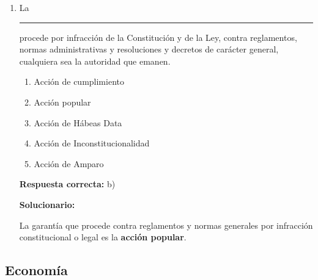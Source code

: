 \begin{enumerate}[resume]
	\vspace{2mm}
	\textbf{Solucionario:}
	
	Uno de los fines esenciales de la ONU es \textbf{mantener la paz mundial}.
	
	\vspace{6mm}
	
	\item La \rule{3cm}{0.4pt} procede por infracción de la Constitución y de la Ley, contra reglamentos, normas administrativas y resoluciones y decretos de carácter general, cualquiera sea la autoridad que emanen.
	\begin{enumerate}[label=\alph*)]
		\item Acción de cumplimiento
		\item Acción popular
		\item Acción de Hábeas Data
		\item Acción de Inconstitucionalidad
		\item Acción de Amparo
	\end{enumerate}
	\textbf{Respuesta correcta:} b)
	
	\vspace{2mm}
	\textbf{Solucionario:}
	
	La garantía que procede contra reglamentos y normas generales por infracción constitucional o legal es la \textbf{acción popular}.
	
	\vspace{6mm}
	
\end{enumerate}

\subsection*{Economía}

